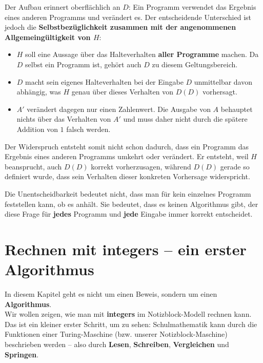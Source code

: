 \documentclass{article}
\begin{document}
Der Aufbau erinnert oberflächlich an $D$: Ein Programm verwendet das Ergebnis eines anderen Programms und verändert es. Der entscheidende Unterschied ist jedoch die \textbf{Selbstbezüglichkeit zusammen mit der angenommenen Allgemeingültigkeit von $H$}:

\begin{itemize}
  \item $H$ soll eine Aussage über das Halteverhalten \textbf{aller Programme} machen. Da $D$ selbst ein Programm ist, gehört auch $D$ zu diesem Geltungsbereich.
  \item $D$ macht sein eigenes Halteverhalten bei der Eingabe $D$ unmittelbar davon abhängig, was $H$ genau über dieses Verhalten von $D(D)$ vorhersagt.
  \item $A'$ verändert dagegen nur einen Zahlenwert. Die Ausgabe von $A$ behauptet nichts über das Verhalten von $A'$ und muss daher nicht durch die spätere Addition von $1$ falsch werden.
\end{itemize}

Der Widerspruch entsteht somit nicht schon dadurch, dass ein Programm das Ergebnis eines anderen Programms umkehrt oder verändert. Er entsteht, weil $H$ beansprucht, auch $D(D)$ korrekt vorherzusagen, während $D(D)$ gerade so definiert wurde, dass sein Verhalten dieser konkreten Vorhersage widerspricht.

\begin{merksatz}
Die Unentscheidbarkeit bedeutet nicht, dass man für kein einzelnes Programm feststellen kann, ob es anhält. Sie bedeutet, dass es keinen Algorithmus gibt, der diese Frage für \textbf{jedes} Programm und \textbf{jede} Eingabe immer korrekt entscheidet.
\end{merksatz}


\section{Rechnen mit integers – ein erster Algorithmus}
        
  In diesem Kapitel geht es nicht um einen Beweis, sondern um einen \textbf{Algorithmus}.\\
            Wir wollen zeigen, wie man mit \textbf{integers} im Notizblock-Modell rechnen kann.\\
            Das ist ein kleiner erster Schritt, um zu sehen: Schulmathematik kann durch die Funktionen einer Turing-Maschine (bzw. unserer Notizblock-Maschine) beschrieben werden – also durch \textbf{Lesen}, \textbf{Schreiben}, \textbf{Vergleichen} und \textbf{Springen}.
\end{document}
